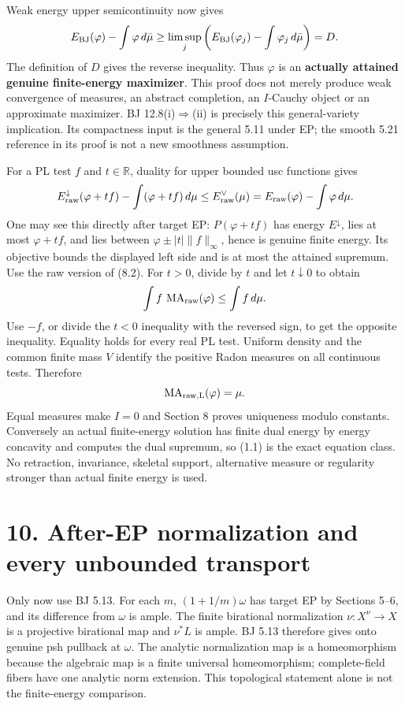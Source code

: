 \documentclass[
  10pt,
]{article}
\begin{document}
Weak energy upper semicontinuity now gives
\[E_{\rm BJ}(\varphi)-\int\varphi\,d\bar\mu
 \ge\limsup_j\left(E_{\rm BJ}(\varphi_j)-\int\varphi_j\,d\bar\mu\right)=D.\]
The definition of \(D\) gives the reverse inequality. Thus \(\varphi\)
is an \textbf{actually attained genuine finite-energy maximizer}. This
proof does not merely produce weak convergence of measures, an abstract
completion, an \(I\)-Cauchy object or an approximate maximizer. BJ
12.8(i)\(\Rightarrow\)(ii) is precisely this general-variety
implication. Its compactness input is the general 5.11 under EP; the
smooth 5.21 reference in its proof is not a new smoothness assumption.

For a PL test \(f\) and \(t\in\mathbb R\), duality for upper bounded usc
functions gives
\[E_{\rm raw}^{\downarrow}(\varphi+tf)-\int(\varphi+tf)\,d\mu
 \le E_{\rm raw}^{\vee}(\mu)
 =E_{\rm raw}(\varphi)-\int\varphi\,d\mu.\] One may see this directly
after target EP: \(P(\varphi+tf)\) has energy \(E^{\downarrow}\), lies
at most \(\varphi+tf\), and lies between \(\varphi\pm|t|\|f\|_\infty\),
hence is genuine finite energy. Its objective bounds the displayed left
side and is at most the attained supremum. Use the raw version of (8.2).
For \(t>0\), divide by \(t\) and let \(t\downarrow0\) to obtain
\[\int f\,\operatorname{MA}_{\rm raw}(\varphi)\le\int f\,d\mu.\] Use
\(-f\), or divide the \(t<0\) inequality with the reversed sign, to get
the opposite inequality. Equality holds for every real PL test. Uniform
density and the common finite mass \(V\) identify the positive Radon
measures on all continuous tests. Therefore
\[\operatorname{MA}_{\rm raw,L}(\varphi)=\mu.\] Equal measures make
\(I=0\) and Section 8 proves uniqueness modulo constants. Conversely an
actual finite-energy solution has finite dual energy by energy concavity
and computes the dual supremum, so (1.1) is the exact equation class. No
retraction, invariance, skeletal support, alternative measure or
regularity stronger than actual finite energy is used.

\section{10. After-EP normalization and every unbounded
transport}\label{after-ep-normalization-and-every-unbounded-transport}

Only now use BJ 5.13. For each \(m\), \((1+1/m)\omega\) has target EP by
Sections 5--6, and its difference from \(\omega\) is ample. The finite
birational normalization \(\nu:X^\nu\to X\) is a projective birational
map and \(\nu^*L\) is ample. BJ 5.13 therefore gives onto genuine psh
pullback at \(\omega\). The analytic normalization map is a
homeomorphism because the algebraic map is a finite universal
homeomorphism; complete-field fibers have one analytic norm extension.
This topological statement alone is not the finite-energy comparison.
\end{document}
